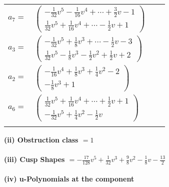 \documentclass[1p]{elsarticle_modified}
\theoremstyle{definition}
\begin{document}
\begin{tabular}{m{7pt} m{180pt} m{7pt} m{180pt} }
\flushright $a_{7}=$&$\begin{pmatrix}-\frac{1}{32} v^5-\frac{1}{16} v^4+\cdots+\frac{3}{2} v-1\\\frac{1}{32} v^5+\frac{1}{16} v^4+\cdots-\frac{1}{2} v+1\end{pmatrix}$ \\
\flushright $a_{3}=$&$\begin{pmatrix}-\frac{1}{32} v^5+\frac{1}{8} v^3+\cdots-\frac{1}{2} v-3\\\frac{1}{32} v^5-\frac{1}{8} v^3-\frac{1}{2} v^2+\frac{1}{2} v+2\end{pmatrix}$ \\
\flushright $a_{2}=$&$\begin{pmatrix}-\frac{1}{16} v^4+\frac{1}{8} v^3+\frac{1}{4} v^2-2\\-\frac{1}{8} v^3+1\end{pmatrix}$ \\
\flushright $a_{6}=$&$\begin{pmatrix}\frac{1}{32} v^5+\frac{1}{16} v^4+\cdots+\frac{1}{2} v+1\\-\frac{1}{32} v^5+\frac{1}{4} v^2-\frac{1}{2} v\end{pmatrix}$\\&\end{tabular}
\flushleft \textbf{(ii) Obstruction class $= 1$}\\~\\
\flushleft \textbf{(iii) Cusp Shapes $= -\frac{17}{128} v^5+\frac{1}{32} v^3+\frac{9}{8} v^2-\frac{1}{8} v-\frac{13}{2}$}\\~\\
\newpage\renewcommand{\arraystretch}{1}
\flushleft \textbf{(iv) u-Polynomials at the component}\newline \\
\end{document}
